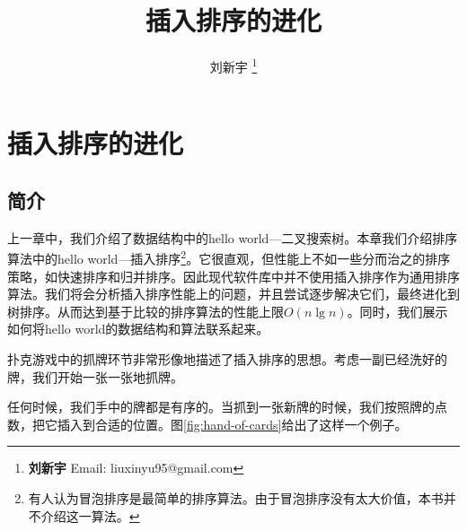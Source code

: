 \documentclass[UTF8]{article}
\begin{document}


\title{插入排序的进化}

\author{刘新宇
\thanks{{\bfseries 刘新宇} \newline
  Email: liuxinyu95@gmail.com \newline}
  }

\maketitle
\fi


\ifx\wholebook\relax
\chapter{插入排序的进化}
\fi

\section{简介}
\label{introduction} 
上一章中，我们介绍了数据结构中的hello world—二叉搜索树。本章我们介绍排序算法中的hello world—插入排序\footnote{有人认为冒泡排序是最简单的排序算法。由于冒泡排序没有太大价值，本书并不介绍这一算法\cite{wiki-bubble-sort}。}。它很直观，但性能上不如一些分而治之的排序策略，如快速排序和归并排序。因此现代软件库中并不使用插入排序作为通用排序算法。我们将会分析插入排序性能上的问题，并且尝试逐步解决它们，最终进化到树排序。从而达到基于比较的排序算法的性能上限$O(n \lg n)$。同时，我们展示如何将hello world的数据结构和算法联系起来。

扑克游戏中的抓牌环节非常形像地描述了插入排序的思想\cite{CLRS}。考虑一副已经洗好的牌，我们开始一张一张地抓牌。

任何时候，我们手中的牌都是有序的。当抓到一张新牌的时候，我们按照牌的点数，把它插入到合适的位置。图\ref{fig:hand-of-cards}给出了这样一个例子。
\end{document}
